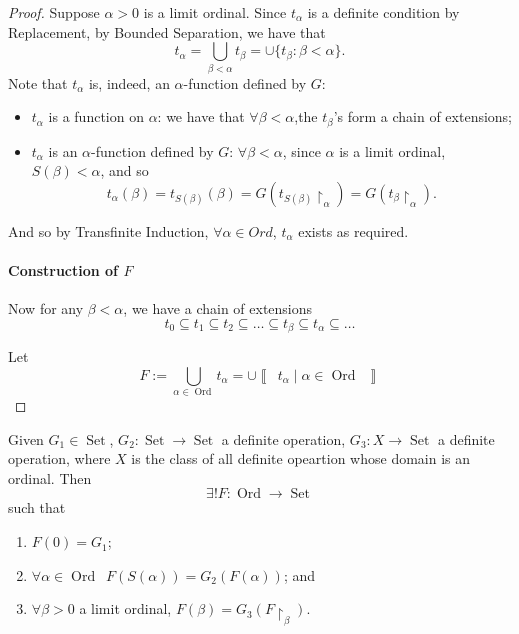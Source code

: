 \documentclass[notoc,notitlepage]{tufte-book}
\newcommand{\class}[1]{\left\llbracket \enspace #1 \enspace \right\rrbracket}
\DeclareMathOperator{\Ord}{Ord }
\DeclareMathOperator{\Set}{Set }
\begin{document}
\begin{proof}
  Suppose $\alpha > 0$ is a limit ordinal. Since $t_\alpha$ is a definite condition by Replacement, by Bounded Separation, we have that
  \begin{equation*}
    t_\alpha = \bigcup_{\beta < \alpha} t_\beta = \cup \{ t_\beta : \beta < \alpha \}.
  \end{equation*}
  Note that $t_\alpha$ is, indeed, an $\alpha$-function defined by $G$:
  \begin{itemize}
    \item $t_\alpha$ is a function on $\alpha$: we have that $\forall \beta < \alpha$,the $t_\beta$'s form a chain of extensions;
    \item $t_\alpha$ is an $\alpha$-function defined by $G$: $\forall \beta < \alpha$, since $\alpha$ is a limit ordinal, $S(\beta) < \alpha$, and so
      \begin{equation*}
        t_\alpha(\beta) = t_{S(\beta)}(\beta) = G(t_{S(\beta)} \restriction_\alpha) = G(t_\beta \restriction_\alpha).
      \end{equation*}
  \end{itemize}
  And so by Transfinite Induction, $\forall \alpha \in Ord$, $t_\alpha$ exists as required.

  \paragraph{Construction of $F$} Now for any $\beta < \alpha$, we have a chain of extensions
  \begin{equation*}
    t_0 \subseteq t_1 \subseteq t_2 \subseteq \hdots \subseteq t_\beta \subseteq t_\alpha \subseteq \hdots
  \end{equation*}

  Let
  \begin{equation*}
    F := \bigcup_{\alpha \in \Ord} t_\alpha = \cup \class{ t_\alpha \mid \alpha \in \Ord }
  \end{equation*}
\end{proof}

\begin{crly}
\label{crly:transfinite_recusions_v2}
  Given $G_1 \in \Set$, $G_2 : \Set \to \Set$ a definite operation, $G_3 : X \to \Set$ a definite operation, where $X$ is the class of all definite opeartion whose domain is an ordinal. Then
  \begin{equation*}
    \exists ! F : \Ord \to \Set
  \end{equation*}
  such that
  \begin{enumerate}
    \item $F(0) = G_1$;
    \item $\forall \alpha \in \Ord \enspace F(S(\alpha)) = G_2(F(\alpha))$; and
    \item $\forall \beta > 0$ a limit ordinal, $F(\beta) = G_3(F\restriction_\beta)$.
  \end{enumerate}
\end{crly}
\end{document}
